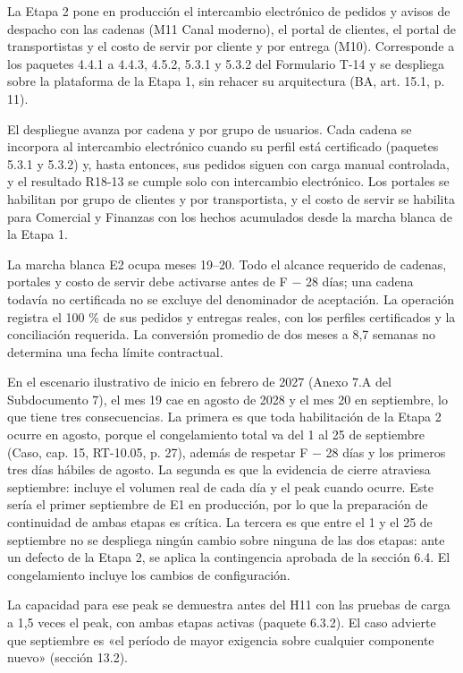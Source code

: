 La Etapa 2 pone en producción el intercambio electrónico de pedidos y avisos de despacho con las cadenas (M11 Canal moderno), el portal de clientes, el portal de transportistas y el costo de servir por cliente y por entrega (M10). Corresponde a los paquetes 4.4.1 a 4.4.3, 4.5.2, 5.3.1 y 5.3.2 del Formulario T-14 y se despliega sobre la plataforma de la Etapa 1, sin rehacer su arquitectura (BA, art. 15.1, p. 11).

El despliegue avanza por cadena y por grupo de usuarios. Cada cadena se incorpora al intercambio electrónico cuando su perfil está certificado (paquetes 5.3.1 y 5.3.2) y, hasta entonces, sus pedidos siguen con carga manual controlada, y el resultado R18-13 se cumple solo con intercambio electrónico. Los portales se habilitan por grupo de clientes y por transportista, y el costo de servir se habilita para Comercial y Finanzas con los hechos acumulados desde la marcha blanca de la Etapa 1.

La marcha blanca E2 ocupa meses 19–20. Todo el alcance requerido de cadenas, portales y costo de servir debe activarse antes de F − 28 días; una cadena todavía no certificada no se excluye del denominador de aceptación. La operación registra el 100 \% de sus pedidos y entregas reales, con los perfiles certificados y la conciliación requerida. La conversión promedio de dos meses a 8,7 semanas no determina una fecha límite contractual.

En el escenario ilustrativo de inicio en febrero de 2027 (Anexo 7.A del Subdocumento 7), el mes 19 cae en agosto de 2028 y el mes 20 en septiembre, lo que tiene tres consecuencias. La primera es que toda habilitación de la Etapa 2 ocurre en agosto, porque el congelamiento total va del 1 al 25 de septiembre (Caso, cap. 15, RT-10.05, p. 27), además de respetar F − 28 días y los primeros tres días hábiles de agosto. La segunda es que la evidencia de cierre atraviesa septiembre: incluye el volumen real de cada día y el peak cuando ocurre. Este sería el primer septiembre de E1 en producción, por lo que la preparación de continuidad de ambas etapas es crítica. La tercera es que entre el 1 y el 25 de septiembre no se despliega ningún cambio sobre ninguna de las dos etapas: ante un defecto de la Etapa 2, se aplica la contingencia aprobada de la sección 6.4. El congelamiento incluye los cambios de configuración.

La capacidad para ese peak se demuestra antes del H11 con las pruebas de carga a 1,5 veces el peak, con ambas etapas activas (paquete 6.3.2). El caso advierte que septiembre es «el período de mayor exigencia sobre cualquier componente nuevo» (sección 13.2).

